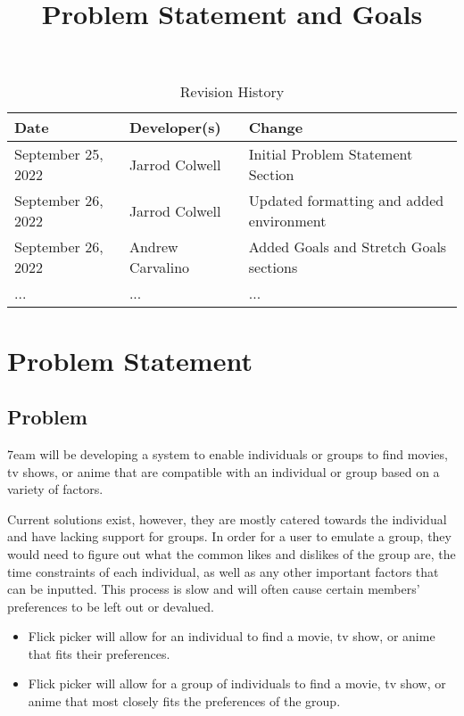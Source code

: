 \documentclass{article}
\title{Problem Statement and Goals\\\progname}
\author{\authname}
\date{}
\begin{document}
\maketitle

\begin{table}[hp]
\caption{Revision History} \label{TblRevisionHistory}
\begin{tabularx}{\textwidth}{llX}
\toprule
\textbf{Date} & \textbf{Developer(s)} & \textbf{Change}\\
\midrule
September 25, 2022 & Jarrod Colwell & Initial Problem Statement Section\\
September 26, 2022 & Jarrod Colwell & Updated formatting and added environment\\
September 26, 2022 & Andrew Carvalino & Added Goals and Stretch Goals sections\\
... & ... & ...\\
\bottomrule
\end{tabularx}
\end{table}

\section{Problem Statement}

\subsection{Problem}

\hspace*{\parindent}7eam will be developing a system to enable individuals or groups to find movies, tv shows, or anime that are compatible with an individual or group based on a variety of factors.\newline


Current solutions exist, however, they are mostly catered towards the individual and have lacking support for groups. In order for a user to emulate a group, they would need to figure out what the common likes and dislikes of the group are, the time constraints of each individual, as well as any other important factors that can be inputted. This process is slow and will often cause certain members' preferences to be left out or devalued. 

\begin{itemize}
	\item Flick picker will allow for an individual to find a movie, tv show, or anime that fits their preferences.	
	\item Flick picker will allow for a group of individuals to find a movie, tv show, or anime that most closely fits the preferences of the group.
\end{itemize}
\end{document}
